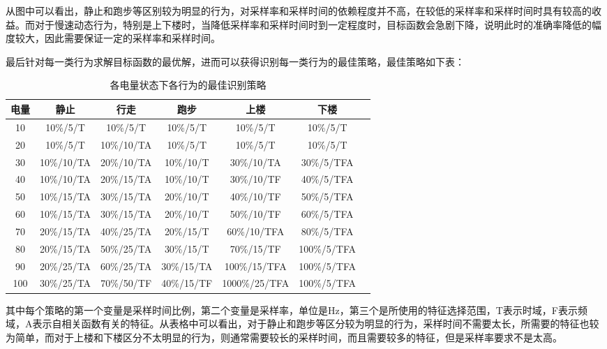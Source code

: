 \par 从图中可以看出，静止和跑步等区别较为明显的行为，对采样率和采样时间的依赖程度并不高，在较低的采样率和采样时间时具有较高的收益。而对于慢速动态行为，特别是上下楼时，当降低采样率和采样时间时到一定程度时，目标函数会急剧下降，说明此时的准确率降低的幅度较大，因此需要保证一定的采样率和采样时间。
\par 最后针对每一类行为求解目标函数的最优解，进而可以获得识别每一类行为的最佳策略，最佳策略如下表：
\begin{table}[htb]
    \centering
    \caption{各电量状态下各行为的最佳识别策略}
    \begin{tabular}{ccccccc}
    \toprule
    电量 & 静止 & 行走 & 跑步 & 上楼 & 下楼 \\
    \midrule
    10 & 10\%/5/T & 10\%/5/T & 10\%/5/T & 10\%/5/T & 10\%/5/T \\
    20 & 10\%/5/T & 10\%/10/TA & 10\%/5/T & 10\%/5/T & 10\%/5/T \\
    30 & 10\%/10/TA & 20\%/10/TA & 10\%/10/T & 30\%/10/TA & 30\%/5/TFA \\
    40 & 10\%/10/TA & 20\%/15/TA & 10\%/10/T & 30\%/10/TF & 40\%/5/TFA \\
    50 & 10\%/15/TA & 30\%/15/TA & 20\%/10/T & 40\%/10/TF & 50\%/5/TFA \\
    60 & 10\%/15/TA & 30\%/15/TA & 20\%/10/T & 50\%/10/TF & 60\%/5/TFA \\
    70 & 20\%/15/TA & 40\%/25/TA & 20\%/15/T & 60\%/10/TFA & 80\%/5/TFA \\
    80 & 20\%/15/TA & 50\%/25/TA & 30\%/15/T & 70\%/15/TF & 100\%/5/TFA \\
    90 & 20\%/25/TA & 60\%/25/TA & 30\%/15/TA & 100\%/15/TFA & 100\%/5/TFA \\
    100 & 30\%/25/TA & 70\%/50/TF & 40\%/15/TF & 1000\%/25/TFA & 100\%/5/TFA \\
    \bottomrule
    \end{tabular}
\end{table}
\par 其中每个策略的第一个变量是采样时间比例，第二个变量是采样率，单位是Hz，第三个是所使用的特征选择范围，T表示时域，F表示频域，A表示自相关函数有关的特征。从表格中可以看出，对于静止和跑步等区分较为明显的行为，采样时间不需要太长，所需要的特征也较为简单，而对于上楼和下楼区分不太明显的行为，则通常需要较长的采样时间，而且需要较多的特征，但是采样率要求不是太高。
